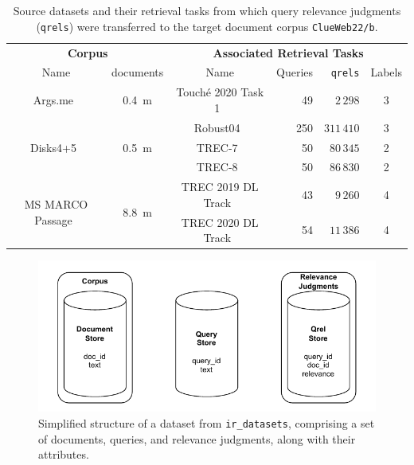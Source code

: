 \begin{table}[t]
    \centering
    \footnotesize
    \caption{Source datasets and their retrieval tasks from which query relevance judgments (\texttt{qrels}) were transferred to the target document corpus \texttt{ClueWeb22/b}.}
    \label{tab:datasets}
    \begin{tabular}{cccrrc}
        \toprule
        \multicolumn{2}{c}{\textbf{Corpus}} & \multicolumn{4}{c}{\textbf{ Associated Retrieval Tasks}} \\
        \cmidrule(lr){1-2} \cmidrule(lr){3-6}
        Name & documents  & Name & Queries &\texttt{qrels} & Labels \\
        \toprule
        
        Args.me~\cite{ajjour:2019} & 0.4~m & Touché 2020 Task 1~\cite{bondarenko:2020} & 49 & $2\,298$ & 3 \\
        \midrule

        \multirow{3}{*}{Disks4+5~\cite{voorhees:1996}} & \multirow{3}{*}{0.5~m} & Robust04~\cite{voorhees:2004} & 250 & $311\,410$ & 3 \\
        & & TREC-7~\cite{voorhees:1998} & 50 & $80\,345$ & 2 \\
        & & TREC-8~\cite{voorhees:1999} & 50 & $86\,830$ & 2 \\
        \midrule

        \multirow{2}{*}{MS MARCO Passage~\cite{bajaj:2016}} & \multirow{2}{*}{8.8~m} & TREC 2019 DL Track~\cite{craswell:2019} & 43 & $9\,260$ & 4 \\
        & & TREC 2020 DL Track~\cite{craswell:2020} & 54 & $11\,386$ & 4 \\
        
        \bottomrule
    \end{tabular}
\end{table}

\begin{figure}[t]
    \centering
    \includegraphics[width=\textwidth]{./graphics/drawio/datasets.pdf}
    \caption{Simplified structure of a dataset from \texttt{ir\_datasets}, comprising a set of documents, queries, and relevance judgments, along with their attributes.}
    \label{fig:datasets}
\end{figure}

